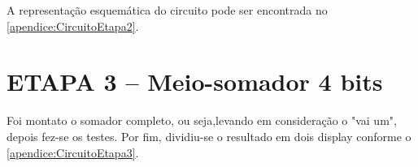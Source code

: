 		A representação esquemática do circuito pode ser encontrada no \autoref{apendice:CircuitoEtapa2}.

	\section{ETAPA 3 – Meio-somador 4 bits}
		Foi montato o somador completo, ou seja,levando em consideração o "vai um",
		 depois fez-se os testes.
		Por fim, dividiu-se o resultado em dois display conforme o \autoref{apendice:CircuitoEtapa3}.








